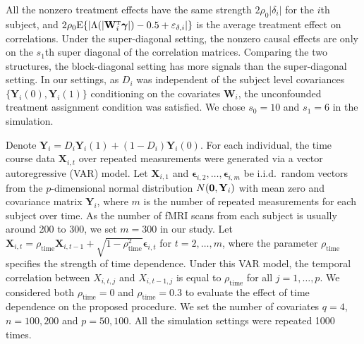 \documentclass[12pt]{article}
\def\T{{ \mathrm{\scriptscriptstyle T} }}
\theoremstyle{definition}
\newcommand{\E}{\rm E}
\newcommand{\bW}{{\mathbf W}}
\newcommand{\bX}{{\mathbf X}}
\newcommand{\bY}{{\mathbf Y}}
\newcommand{\bepsilonbb}{\boldsymbol{\epsilon}}
\newcommand{\bgamma}{\boldsymbol{\gamma}}
\begin{document}
All the nonzero treatment effects have the same strength $2 \rho_0 |\delta_{i}|$ for the $i$th subject, and $2 \rho_0 {\E}\{|\Lambda(|\bW_{i}^{\T}\bgamma|) - 0.5 + \varepsilon_{\delta, i}|\}$ is the average treatment effect on correlations. 
Under the super-diagonal setting, the nonzero causal effects are only on the $s_1$th super diagonal of the correlation matrices. Comparing the two structures, the block-diagonal setting has more signals than the super-diagonal setting. 
In our settings, as $D_i$ was independent of the subject level covariances $\{\bY_{i}(0),\bY_{i}(1)\}$ conditioning on the covariates $\bW_i$, the unconfounded treatment assignment condition was satisfied. We chose $s_0 = 10$ and $s_1 = 6$ in the simulation.

Denote $\bY_{i} = D_{i}\bY_{i}(1) + (1 - D_{i}) \bY_{i}(0)$. For each individual, the time course data $\bX_{i, t}$ over repeated measurements were generated via a vector autoregressive (VAR) model. 
Let $\bX_{i, 1}$ and $\bepsilonbb_{i, 2}, \ldots, \bepsilonbb_{i, m}$ be i.i.d.\ random vectors from the $p$-dimensional normal distribution $N({\bf 0}, \bY_{i})$ with mean zero and covariance matrix $\bY_{i}$, where $m$ is the number of repeated measurements for each subject over time. 
As the number of fMRI scans from each subject is usually around 200 to 300, we set $m = 300$ in our study.
Let $\bX_{i, t} = \rho_{\mathrm{\scriptstyle time}} \bX_{i, t-1} + \sqrt{1 - \rho_{\mathrm{\scriptstyle time}}^{2}}\bepsilonbb_{i, t}$ for $t = 2, \ldots, m$, where the parameter $\rho_{\mathrm{\scriptstyle time}}$ specifies the strength of time dependence.
Under this VAR model, the temporal correlation between $X_{i, t, j}$ and $X_{i, t-1, j}$ is equal to $\rho_{\mathrm{\scriptstyle time}}$ for all $j = 1, \ldots, p$. We considered both $\rho_{\mathrm{\scriptstyle time}}=0$ and $\rho_{\mathrm{\scriptstyle time}}=0.3$ to evaluate the effect of time dependence on the proposed procedure.
We set the number of covariates $q = 4$, $n = 100, 200$ and $p = 50, 100$. All the simulation settings were repeated 1000 times. 
\end{document}
